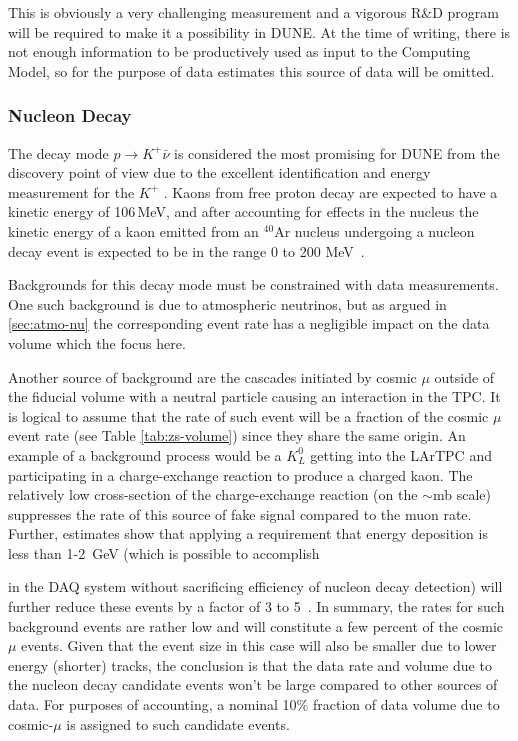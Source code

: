 This is obviously a very challenging measurement and a vigorous R\&D program will be required to make it a
possibility in DUNE. At the time of writing, there is not enough information to be productively used as input to
the Computing Model, so for the purpose of data estimates this source of data will be omitted.


\subsubsection{Nucleon Decay}
\label{sec:pdk-data}
The decay mode $p \rightarrow K^+\bar{\nu}$ is considered the most promising
for DUNE  from the discovery point of view due to the excellent  
identification and energy measurement for the $K^+$ \cite{cdr_vol2}.
Kaons from free proton decay are expected to have a kinetic
energy of 106\,MeV, and after accounting for effects in the nucleus the kinetic energy of a kaon
emitted from an $^{40}$Ar nucleus undergoing a nucleon decay event is expected to be in the range
0 to 200 MeV~\cite{muon_bkgd_pdk}.

Backgrounds for this decay mode must be constrained with data measurements.
One such background is due to atmospheric neutrinos,
but as argued in \ref{sec:atmo-nu} the corresponding event rate has a negligible impact on the
data volume which the focus here.

Another source of background are the cascades initiated by cosmic $\mu$ outside of the fiducial
volume with a neutral particle causing an interaction in the TPC. It is logical to assume that the rate
of such event will be a fraction of the cosmic $\mu$ event rate (see Table \ref{tab:zs-volume})
since they share the same origin. An example of a background process would be a $K_L^0$ getting
into the LArTPC and participating in a charge-exchange reaction to produce a charged kaon.
The relatively low cross-section of the charge-exchange reaction (on the $\sim$mb scale) 
suppresses the rate of this source of fake signal compared to the muon rate. Further, estimates show that
applying a requirement that energy deposition is less than 1-2~GeV (which is possible to accomplish

in the DAQ system without sacrificing efficiency of nucleon decay detection) will further reduce
these events by a factor of 3 to 5~\cite{kudr_bkgd_pdk}.
In summary, the rates for such background events are rather low and will
constitute a few percent of the cosmic $\mu$ events. Given that the event size in this case
will also be smaller due to lower energy (shorter) tracks, the conclusion is that the data rate
and volume due to the nucleon decay candidate events won't be large compared to
other sources of data. For purposes of accounting, a nominal 10\% fraction of data volume due
to cosmic-$\mu$ is assigned to such candidate events.

